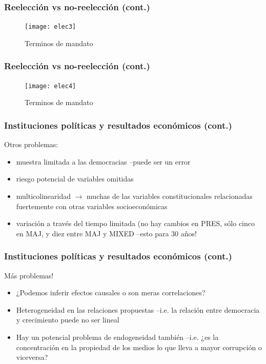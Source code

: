 \documentclass[handout,final,xcolor=dvipsnames]{beamer}
\begin{document}
\begin{frame}\frametitle{Reelección vs no-reelección (cont.)}
  \begin{figure}[htbp]
    \centering \vspace{-5.5cm}
    \texttt{[image: elec3]}
    \caption{Terminos de mandato}
    \label{fig:elec1}
  \end{figure}
\end{frame}


\begin{frame}\frametitle{Reelección vs no-reelección (cont.)}
  \begin{figure}[htbp]
    \centering \vspace{-5.5cm}
    \texttt{[image: elec4]}
    \caption{Terminos de mandato}
    \label{fig:elec1}
  \end{figure}
\end{frame}



\begin{frame}\frametitle{Instituciones políticas y resultados económicos (cont.)}
Otros problemas: \medskip 
\begin{itemize}\itemsep 10pt
\item muestra limitada a las democracias –puede ser un error
\item riesgo potencial de variables omitidas
\item multicolinearidad $\longrightarrow$ muchas de las variables constitucionales relacionadas fuertemente con otras variables socioeconómicas
\item variación a través del tiempo limitada (no hay cambios en PRES, sólo cinco en MAJ, y diez entre MAJ y MIXED –esto para 30 años!
\end{itemize}
\end{frame}


\begin{frame} \frametitle{Instituciones políticas y resultados económicos (cont.)}
Más problemas! \medskip
\begin{itemize} \itemsep 10pt
\item ¿Podemos inferir efectos causales o son meras correlaciones?
\item Heterogeneidad en las relaciones propuestas –i.e. la relación entre democracia y crecimiento puede no ser lineal
\item Hay un potencial problema de endogeneidad también –i.e. ¿es la concentración en la propiedad de los medios lo que lleva a mayor corrupción o viceversa?
\end{itemize}
\end{frame}
\end{document}
